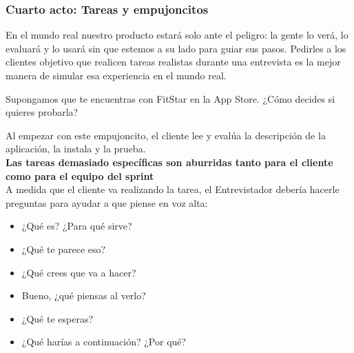 \documentclass[10pt]{article}
\begin{document}
\begin{multicols}{2}
\subsubsection*{Cuarto acto: Tareas y empujoncitos}
En el mundo real nuestro producto estará solo ante el peligro: la gente lo verá, lo evaluará y lo usará sin que estemos a su lado para guiar sus pasos. Pedirles a los clientes objetivo que realicen tareas realistas durante una entrevista es la mejor manera de simular esa experiencia en el mundo real.
\begin{center}
Supongamos que te encuentras con FitStar en la App Store. ¿Cómo decides si quieres probarla?
\end{center}
Al empezar con este empujoncito, el cliente lee y evalúa la descripción de la aplicación, la instala y la prueba.\\
\textbf{Las tareas demasiado específicas son aburridas tanto para el cliente como para el equipo del sprint}\\
A medida que el cliente va realizando la tarea, el Entrevistador debería hacerle preguntas para ayudar a que piense en voz alta:
\begin{itemize}
\item ¿Qué es? ¿Para qué sirve?
\item ¿Qué te parece eso?
\item ¿Qué crees que va a hacer?
\item Bueno, ¿qué piensas al verlo?
\item ¿Qué te esperas?
\item ¿Qué harías a continuación? ¿Por qué?
\end{itemize}

\end{multicols}
\end{document}
